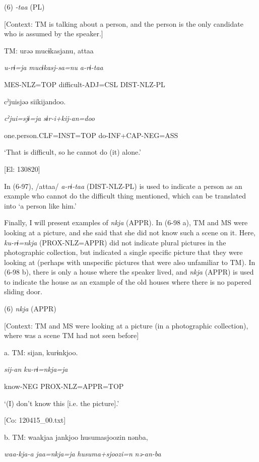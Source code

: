 (6)  \textit{{}-taa} (PL)

  [Context: TM is talking about a person, and the person is the only candidate who is assumed by the speaker.]

  TM:  urəə  mucɨkasjanu,  attaa

    \textit{u-rɨ=ja}  \textit{mucɨkasj-sa=nu}  \textit{a-rɨ-taa}

    MES-NLZ=TOP  difficult-ADJ=CSL  DIST-NLZ-PL

    cˀjuisjəə  siikijandoo.

    \textit{cˀjui=sjɨ=ja}  \textit{sɨr-i+kij-an=doo}

    one.person.CLF=INST=TOP  do-INF+CAP-NEG=ASS

    ‘That is difficult, so he cannot do (it) alone.’

    [El: 130820]

In (6-97), /attaa/ \textit{a-rɨ-taa} (DIST-NLZ-PL) is used to indicate a person as an example who cannot do the difficult thing mentioned, which can be translated into ‘a person like him.’

  Finally, I will present examples of \textit{nkja} (APPR). In (6-98 a), TM and MS were looking at a picture, and she said that she did not know such a scene on it. Here, \textit{ku-rɨ=nkja} (PROX-NLZ=APPR) did not indicate plural pictures in the photographic collection, but indicated a single specific picture that they were looking at (perhaps with unspecific pictures that were also unfamiliar to TM). In (6-98 b), there is only a house where the speaker lived, and \textit{nkja} (APPR) is used to indicate the house as an example of the old houses where there is no papered sliding door.

(6)  \textit{nkja} (APPR)

  [Context: TM and MS were looking at a picture (in a photographic collection), where was a scene TM had not seen before]

  a.  TM:  sijan,  kurɨnkjoo.

      \textit{sij-an}  \textit{ku-rɨ=nkja=ja}

      know-NEG  PROX-NLZ=APPR=TOP

      ‘(I) don’t know this [i.e. the picture].’

      [Co: 120415\_00.txt]

  b.  TM:  waakjaa  jankjoo  {\textbar}husumasjoozi{\textbar}n  nənba,

      \textit{waa-kja-a}  \textit{jaa=nkja=ja}  \textit{husuma+sjoozi=n}  \textit{nə-an-ba}

